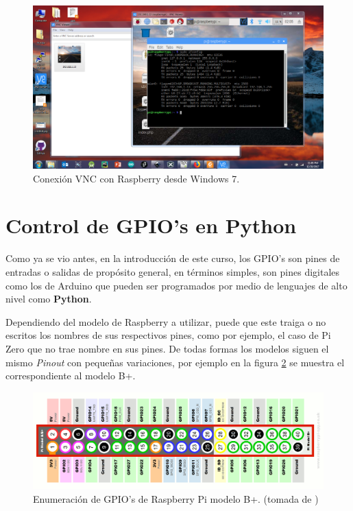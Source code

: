 \documentclass[letterpaper, 10pt]{report}
\begin{document}
\begin{enumerate}
\begin{figure}[h!]
	\centering
	\includegraphics[scale=0.3]{vnc.png}
	\caption{Conexión VNC con Raspberry desde Windows 7. \label{vnc}}
\end{figure}
\end{enumerate}

\newpage
\section{Control de GPIO's en Python}

Como ya se vio antes, en la introducción de este curso, los GPIO's son pines de entradas o salidas de propósito general, en términos simples, son pines digitales como los de Arduino que pueden ser programados por medio de lenguajes de alto nivel como \textbf{Python}.

Dependiendo del modelo de Raspberry a utilizar, puede que este traiga o no escritos los nombres de sus respectivos pines, como por ejemplo, el caso de Pi Zero que no trae nombre en sus pines. De todas formas los modelos siguen el mismo \emph{Pinout} con pequeñas variaciones, por ejemplo en la figura \ref{gpios} se muestra el correspondiente al modelo B+.
\begin{figure}[h!]
	\centering
	\includegraphics[scale=0.55]{gpios.png}
	\caption{Enumeración de GPIO's de Raspberry Pi modelo B+. (tomada de \cite{gpio}) \label{gpios}}
\end{figure}
\end{document}
